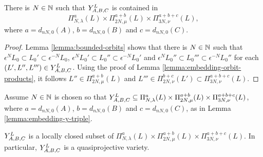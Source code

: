 \documentclass[a4paper, 11pt, twoside]{report}
\begin{document}
\begin{lemma}\label{lemma:embedding-y-triple}
There is $N\in\naturals$ such that $\yprod[L]{A,B,C}$ is contained in
\begin{equation*}
\Pi_{N,\lambda}^a(L)\times\Pi_{2N,\mu}^{a+b}(L)\times\Pi_{3N,\nu}^{a+b+c}(L),
\end{equation*}
where $a=d_{nN,0}{(A)}$, $b=d_{nN,0}{(B)}$ and $c=d_{nN,0}{(C)}$.
\end{lemma}

\begin{proof}
Lemma \ref{lemma:bounded-orbits} shows that there is $N\in\naturals$ such that $\epsilon^N L_0\subset L_0'\subset\epsilon^{-N}L_0$, $\epsilon^N L_0'\subset L_0''\subset\epsilon^{-N}L_0'$ and $\epsilon^N L_0''\subset L_0'''\subset\epsilon^{-N}L_0''$ for each $(L',L'',L''')\in\yprod[L]{A,B,C}$. Using the proof of Lemma \ref{lemma:embedding-orbit-products}, it follows $L''\in\Pi_{2N,\mu}^{a+b}(L)$ and $L'''\in\Pi_{2N,\nu}^{b+c}(L')\subset\Pi_{3N,\nu}^{a+b+c}(L)$.
\end{proof}

Assume $N\in\naturals$ is chosen so that $\yprod[L]{A,B,C}\subset\Pi_{N,\lambda}^a(L)\times\Pi_{2N,\mu}^{a+b}(L)\times\Pi_{3N,\nu}^{a+b+c}(L)$, where $a=d_{nN,0}{(A)}$, $b=d_{nN,0}{(B)}$ and $c=d_{nN,0}{(C)}$, as in Lemma \ref{lemma:embedding-y-triple}.

\begin{lemma}\label{lemma:y-triple-is-quasiprojective}
$\yprod[L]{A,B,C}$ is a locally closed subset of $\Pi_{N,\lambda}^a(L)\times\Pi_{2N,\mu}^{a+b}(L)\times\Pi_{3N,\nu}^{a+b+c}(L)$. In particular, $\yprod[L]{A,B,C}$ is a quasiprojective variety.
\end{lemma}
\end{document}
